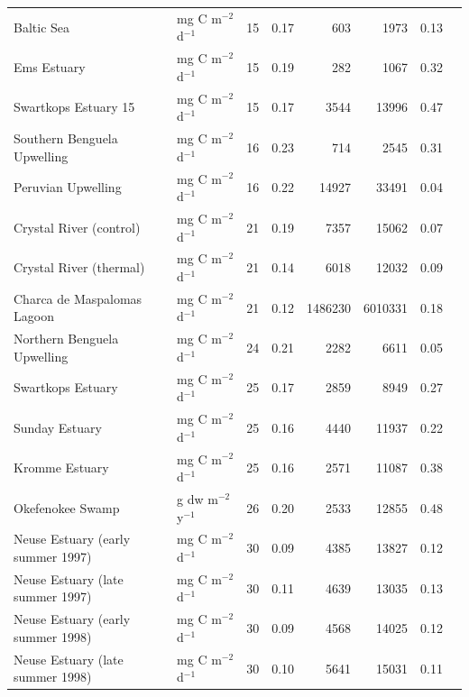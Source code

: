 \documentclass[11pt]{article}
\begin{document}
\begin{table}[ht]
\begin{center}
\begin{tiny}
\begin{tabular}{llrrrrrr}
      Baltic Sea & mg C m$^{-2}$ d$^{-1}$  &  15 & 0.17 & 603 & 1973 & 0.13 &   \citet{baird91} \\ 
      Ems Estuary & mg C m$^{-2}$ d$^{-1}$  &  15 & 0.19 & 282 & 1067 & 0.32 &  \citet{baird91} \\ 
      Swartkops Estuary  15 & mg C m$^{-2}$ d$^{-1}$  &  15 & 0.17 & 3544 & 13996 & 0.47 &   \citet{baird91} \\ 
      Southern Benguela Upwelling & mg C m$^{-2}$ d$^{-1}$  &  16 & 0.23 & 714 & 2545 & 0.31 & \citet{baird91} \\ 
      Peruvian Upwelling & mg C m$^{-2}$ d$^{-1}$  &  16 & 0.22 & 14927 & 33491 & 0.04 &  \citet{baird91} \\ 
      Crystal River (control) & mg C m$^{-2}$ d$^{-1}$  &  21 & 0.19 & 7357 & 15062 & 0.07 &  \citet{ulanowicz86} \\ 
      Crystal River (thermal) & mg C m$^{-2}$ d$^{-1}$  &  21 & 0.14 & 6018 & 12032 & 0.09 &  \citet{ulanowicz86} \\ 
      Charca de Maspalomas Lagoon & mg C m$^{-2}$ d$^{-1}$  &  21 & 0.12 & 1486230 & 6010331 & 0.18 &  \citet{almunia99} \\ 
      Northern Benguela Upwelling & mg C m$^{-2}$ d$^{-1}$  &  24 & 0.21 & 2282 & 6611 & 0.05 &  \citet{heymans00} \\ 
      Swartkops Estuary & mg C m$^{-2}$ d$^{-1}$  &  25 & 0.17 & 2859 & 8949 & 0.27 & \citet{scharler05} \\ 
      Sunday Estuary & mg C m$^{-2}$ d$^{-1}$  &  25 & 0.16 & 4440 & 11937 & 0.22 & \citet{scharler05} \\ 
      Kromme Estuary & mg C m$^{-2}$ d$^{-1}$  &  25 & 0.16 & 2571 & 11087 & 0.38 & \citet{scharler05} \\ 
      Okefenokee Swamp & g dw m$^{-2}$ y$^{-1}$  &  26 & 0.20 & 2533 & 12855 & 0.48 & \citet{whipple93} \\ 
      Neuse Estuary (early summer 1997) & mg C m$^{-2}$ d$^{-1}$  &  30 & 0.09 & 4385 & 13827 & 0.12 &  \citet{baird04} \\ 
      Neuse Estuary (late summer 1997)  & mg C m$^{-2}$ d$^{-1}$  &  30 & 0.11 & 4639 & 13035 & 0.13 &  \citet{baird04} \\ 
      Neuse Estuary (early summer 1998) & mg C m$^{-2}$ d$^{-1}$  &  30 & 0.09 & 4568 & 14025 & 0.12 &  \citet{baird04} \\ 
      Neuse Estuary (late summer 1998) & mg C m$^{-2}$ d$^{-1}$  &  30 & 0.10 & 5641 & 15031 & 0.11 &  \citet{baird04} \\ 

\end{tabular}
\end{tiny}
\end{center}
\end{table}
\end{document}
